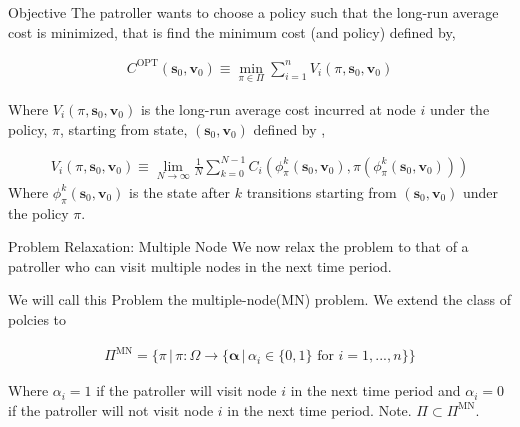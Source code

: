 \documentclass[10pt]{beamer}
\begin{document}
\begin{frame}{Objective}
The patroller wants to choose a policy such that the long-run average cost is minimized, that is find the minimum cost (and policy) defined by,

\begin{align*}
C^{\text{OPT}}(\bm{s}_{0},\bm{v}_{0}) \equiv \min\limits_{\pi \in \Pi} \sum\limits_{i=1}^{n} V_{i}(\pi,\bm{s}_{0},\bm{v}_{0})
\end{align*}

Where $V_{i}(\pi,\bm{s}_{0},\bm{v}_{0})$ is the long-run average cost incurred at node $i$ under the policy, $\pi$, starting from state, $(\bm{s}_{0},\bm{v}_{0})$ defined by ,

\begin{align*}
V_{i}(\pi,\bm{s}_{0},\bm{v}_{0}) \equiv \lim\limits_{N \rightarrow \infty} \frac{1}{N} \sum\limits_{k=0}^{N-1} C_{i}(\phi^{k}_{\pi}(\bm{s}_{0},\bm{v}_{0}),\pi(\phi^{k}_{\pi}(\bm{s}_{0},\bm{v}_{0})))
\end{align*}
Where $\phi^{k}_{\pi}(\bm{s}_{0},\bm{v}_{0})$ is the state after $k$ transitions starting from $(\bm{s}_{0},\bm{v}_{0})$ under the policy $\pi$.

\end{frame}

\begin{frame}{Problem Relaxation: Multiple Node}
We now relax the problem to that of a patroller who can visit multiple nodes in the next time period.

We will call this Problem the multiple-node(MN) problem. We extend the class of polcies to 

\begin{align*}
\Pi^{\text{MN}}= \{\pi \,  | \, \pi : \Omega \rightarrow \{\bm{\alpha} \, | \, \alpha_{i} \in \{0,1 \} \text{ for } i=1,...,n \}   \}
\end{align*}

Where $\alpha_{i}=1$ if the patroller will visit node $i$ in the next time period and $\alpha_{i}=0$ if the patroller will not visit node $i$ in the next time period.
Note. $\Pi \subset \Pi^{\text{MN}}$.
\end{frame}
\end{document}
